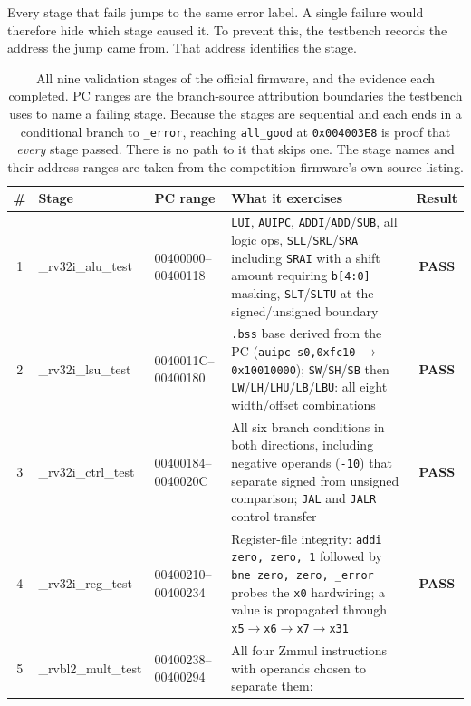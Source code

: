 \documentclass[11pt,a4paper]{article}
\newcommand{\hdr}[1]{\textbf{#1}}
\newcommand{\hrow}{\rowcolor{rvbltint}}
\newcommand{\ok}{\textcolor{okgreen}{\textbf{PASS}}}
\begin{document}
Every stage that fails jumps to the same error label. A single failure would therefore hide
which stage caused it. To prevent this, the testbench records the address the jump came
from. That address identifies the stage.

\begin{table}[htbp]
\centering\scriptsize
\caption{All nine validation stages of the official firmware, and the evidence each
completed. PC ranges are the branch-source attribution boundaries the testbench uses to name
a failing stage. Because the stages are sequential and each ends in a conditional branch to
\texttt{\_error}, reaching \texttt{all\_good} at \texttt{0x004003E8} is proof that
\emph{every} stage passed. There is no path to it that skips one. The stage names and
their address ranges are taken from the competition firmware's own source listing.}
\label{tab:stages}
\setlength{\tabcolsep}{4pt}
\begin{tabularx}{\linewidth}{c>{\ttfamily\scriptsize}p{2.85cm}>{\ttfamily\scriptsize}p{2.75cm}Xc}
\toprule
\hrow \hdr{\#} & \normalfont\bfseries Stage & \normalfont\bfseries PC range &
\hdr{What it exercises} & \hdr{Result} \\
\midrule
1 & \_rv32i\_alu\_test & 00400000--00400118 &
  \texttt{LUI}, \texttt{AUIPC}, \texttt{ADDI}/\texttt{ADD}/\texttt{SUB}, all logic ops,
  \texttt{SLL}/\texttt{SRL}/\texttt{SRA} including \texttt{SRAI} with a shift amount
  requiring \texttt{b[4:0]} masking, \texttt{SLT}/\texttt{SLTU} at the signed/unsigned
  boundary & \ok \\
2 & \_rv32i\_lsu\_test & 0040011C--00400180 &
  \texttt{.bss} base derived from the PC (\texttt{auipc s0,0xfc10} $\to$
  \texttt{0x10010000}); \texttt{SW}/\texttt{SH}/\texttt{SB} then
  \texttt{LW}/\texttt{LH}/\texttt{LHU}/\texttt{LB}/\texttt{LBU}: all eight width/offset
  combinations & \ok \\
3 & \_rv32i\_ctrl\_test & 00400184--0040020C &
  All six branch conditions in both directions, including negative operands
  (\texttt{-10}) that separate signed from unsigned comparison; \texttt{JAL} and
  \texttt{JALR} control transfer & \ok \\
4 & \_rv32i\_reg\_test & 00400210--00400234 &
  Register-file integrity: \texttt{addi zero, zero, 1} followed by
  \texttt{bne zero, zero, \_error} probes the \texttt{x0} hardwiring; a value is propagated
  through \texttt{x5}$\to$\texttt{x6}$\to$\texttt{x7}$\to$\texttt{x31} & \ok \\
5 & \_rvbl2\_mult\_test & 00400238--00400294 &
  All four Zmmul instructions with operands chosen to separate them:

\end{tabularx}
\end{table}
\end{document}
